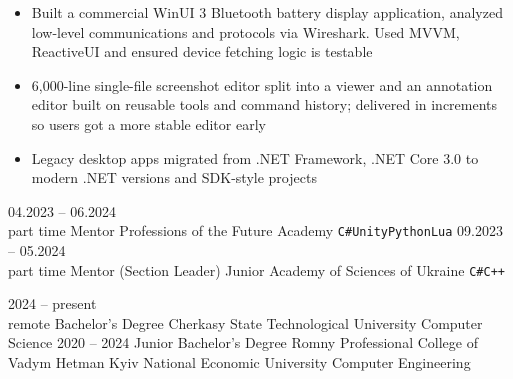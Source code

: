 \documentclass[9pt]{developercv} %
\begin{document}
\begin{entrylist}
{			\begin{itemize}
				\item Built a commercial WinUI 3 Bluetooth battery display application, analyzed low-level communications and protocols via Wireshark. Used MVVM, ReactiveUI and ensured device fetching logic is testable
				\item 6,000-line single-file screenshot editor split into a viewer and an annotation editor built on reusable tools and command history; delivered in increments so users got a more stable editor early
				\item Legacy desktop apps migrated from .NET Framework, .NET Core 3.0 to modern .NET versions and SDK-style projects
			\end{itemize}			
		}
	\entry
		{04.2023 -- 06.2024\\\footnotesize{part time}}
		{Mentor}
		{Professions of the Future Academy}
		{\texttt{C\#}\slashsep\texttt{Unity}\slashsep\texttt{Python}\slashsep\texttt{Lua}}
		{}
		{}
	\entry
		{09.2023 -- 05.2024\\\footnotesize{part time}}
		{Mentor (Section Leader)}
		{Junior Academy of Sciences of Ukraine}
		{\texttt{C\#}\slashsep\texttt{C++}}
		{}
		{}
\end{entrylist}



\begin{entrylist}
	\entry
		{2024 -- present \\ \footnotesize remote}
		{Bachelor's Degree}
		{Cherkasy State Technological University}
		{Computer Science}{}{}
	\entry
		{2020 -- 2024}
		{Junior Bachelor's Degree}
		{Romny Professional College of Vadym Hetman Kyiv National Economic University}
		{Computer Engineering}{}{}
\end{entrylist}

\end{document}
